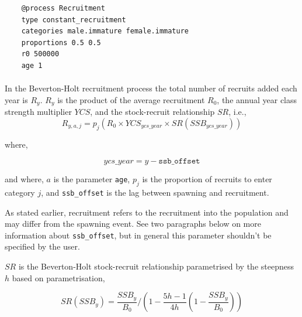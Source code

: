 {\small{\begin{verbatim}
	@process Recruitment
	type constant_recruitment
	categories male.immature female.immature
	proportions 0.5 0.5
	r0 500000
	age 1
\end{verbatim}}}

\paragraph{}\label{subsubsec:BH-recruitment}

In the Beverton-Holt recruitment process the total number of recruits added each year is $R_y$. $R_y$ is the product of the average recruitment $R_0$, the annual year class strength multiplier $YCS$, and the stock-recruit relationship $SR$, i.e.,
\begin{equation}\label{eq:BH}
  R_{y,a,j} = p_j(R_0 \times YCS_{ycs\_year} \times SR(SSB_{ycs\_year}))
\end{equation}

where,

\begin{equation}\label{eq:year_class}
ycs\_year = y - \texttt{ssb\_offset}
\end{equation}

and where, $a$ is the parameter \texttt{age}, $p_j$ is the proportion of recruits to enter category $j$, and \texttt{ssb\_offset} is the lag between spawning and recruitment.

As stated earlier, recruitment refers to the recruitment into the population and may differ from the spawning event. See two paragraphs below on more information about \texttt{ssb\_offset}, but in general this parameter shouldn't be specified by the user.

$SR$ is the Beverton-Holt stock-recruit relationship parametrised by the steepness $h$ based on \cite{mace_doonan_88} parametrisation,

\begin{equation}\label{eq:BH_SR}
SR(SSB_y) = \frac{SSB_y}{B_0} / \left( 1-\frac{5h-1}{4h} \left( 1-\frac{SSB_y}{B_0} \right) \right)
\end{equation}

